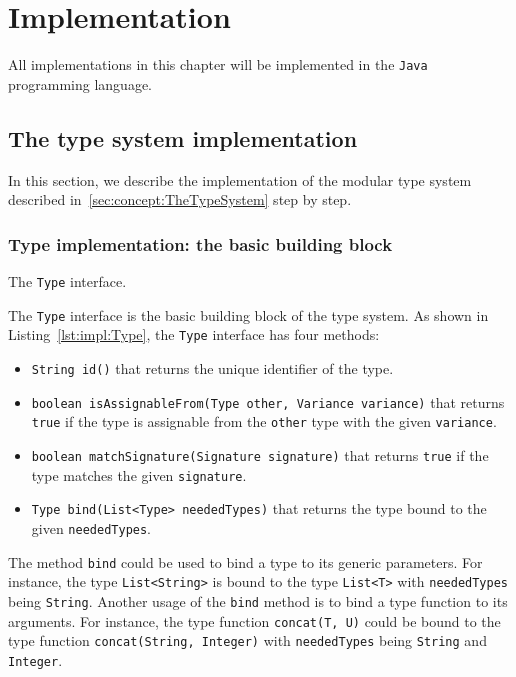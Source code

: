 \chapter{Implementation}\label{chap:Implementation}

All implementations in this chapter will be implemented in the \texttt{Java} programming language.

\section{The type system implementation}\label{sec:impl:TypeSystem}

In this section, we describe the implementation of the modular type system described in~\ref{sec:concept:TheTypeSystem} step by step.

\subsection{Type implementation: the basic building block}\label{sec:impl:Type}

\begin{Listing}[tbh]
    \centering
    \caption{The \texttt{Type} interface.}
    \label{lst:impl:Type}
\end{Listing}

The \texttt{Type} interface is the basic building block of the type system. As shown in Listing~\ref{lst:impl:Type}, the \texttt{Type} interface has four methods:
\begin{itemize}
    \item \texttt{String id()} that returns the unique identifier of the type.
    \item \texttt{boolean isAssignableFrom(Type other, Variance variance)} that returns \texttt{true} if the type is assignable from the \texttt{other} type with the given \texttt{variance}.
    \item \texttt{boolean matchSignature(Signature signature)} that returns \texttt{true} if the type matches the given \texttt{signature}.
    \item \texttt{Type bind(List<Type> neededTypes)} that returns the type bound to the given \texttt{neededTypes}.
\end{itemize}

The method \texttt{bind} could be used to bind a type to its generic parameters. For instance, the type \texttt{List<String>} is bound to the type \texttt{List<T>} with \texttt{neededTypes} being \texttt{String}. Another usage of the \texttt{bind} method is to bind a type function to its arguments. For instance, the type function \texttt{concat(T, U)} could be bound to the type function \texttt{concat(String, Integer)} with \texttt{neededTypes} being \texttt{String} and \texttt{Integer}.

